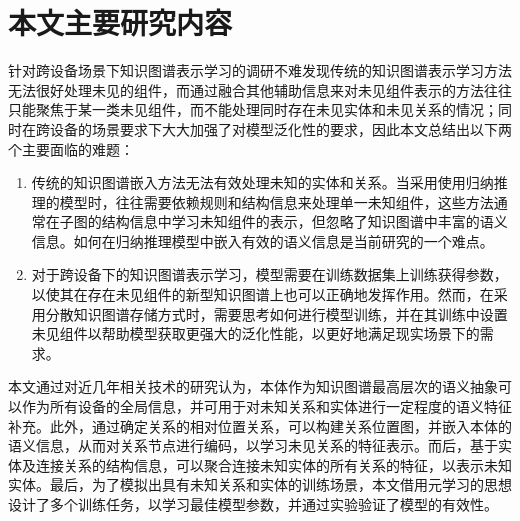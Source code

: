 \section{本文主要研究内容}
针对跨设备场景下知识图谱表示学习的调研不难发现传统的知识图谱表示学习方法无法很好处理未见的组件，而通过融合其他辅助信息来对未见组件表示的方法往往只能聚焦于某一类未见组件，而不能处理同时存在未见实体和未见关系的情况；同时在跨设备的场景要求下大大加强了对模型泛化性的要求，因此本文总结出以下两个主要面临的难题：

\begin{enumerate}[label=\arabic*)]
  \item 传统的知识图谱嵌入方法无法有效处理未知的实体和关系。当采用使用归纳推理的模型时，往往需要依赖规则和结构信息来处理单一未知组件，这些方法通常在子图的结构信息中学习未知组件的表示，但忽略了知识图谱中丰富的语义信息。如何在归纳推理模型中嵌入有效的语义信息是当前研究的一个难点。

  \item 对于跨设备下的知识图谱表示学习，模型需要在训练数据集上训练获得参数，以使其在存在未见组件的新型知识图谱上也可以正确地发挥作用。然而，在采用分散知识图谱存储方式时，需要思考如何进行模型训练，并在其训练中设置未见组件以帮助模型获取更强大的泛化性能，以更好地满足现实场景下的需求。
\end{enumerate}


本文通过对近几年相关技术的研究认为，本体作为知识图谱最高层次的语义抽象可以作为所有设备的全局信息，并可用于对未知关系和实体进行一定程度的语义特征补充。此外，通过确定关系的相对位置关系，可以构建关系位置图，并嵌入本体的语义信息，从而对关系节点进行编码，以学习未见关系的特征表示。而后，基于实体及连接关系的结构信息，可以聚合连接未知实体的所有关系的特征，以表示未知实体。最后，为了模拟出具有未知关系和实体的训练场景，本文借用元学习的思想设计了多个训练任务，以学习最佳模型参数，并通过实验验证了模型的有效性。

